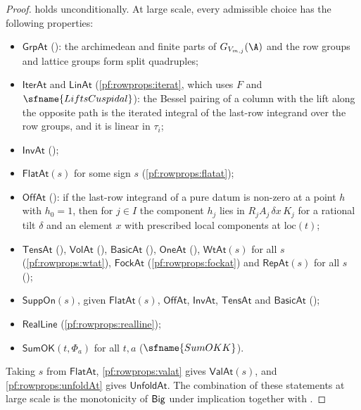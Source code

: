 \begin{proof}
 holds unconditionally. At large scale, every admissible choice has the following properties:
\begin{itemize}
\item $\mathsf{GrpAt}$ (): the archimedean and finite parts of $G_{V_{m,j}}(\A)$ and
the row groups and lattice groups form split quadruples;
\item $\mathsf{IterAt}$ and $\mathsf{LinAt}$ (\cref{pf:rowprops:iterat}, which uses $F$ and
$\sfname{LiftsCuspidal}$): the Bessel pairing of a column with the lift along the opposite path is the iterated integral of
the last-row integrand over the row groups, and it is linear in $\tau_i$;
\item $\mathsf{InvAt}$ ();
\item $\mathsf{FlatAt}(s)$ for some sign $s$ (\cref{pf:rowprops:flatat});
\item $\mathsf{OffAt}$ (): if the last-row integrand of a pure
datum is non-zero at a point $h$ with $h_0=1$, then for $j\in I$ the component $h_j$ lies in $R_jA_j\,\delta x\,K_j$ for a
rational tilt $\delta$ and an element $x$ with prescribed local components at $\mathrm{loc}(t)$;
\item $\mathsf{TensAt}$ (), $\mathsf{VolAt}$
(), $\mathsf{BasicAt}$
(), $\mathsf{OneAt}$ (),
$\mathsf{WtAt}(s)$ for all $s$ (\cref{pf:rowprops:wtat}), $\mathsf{FockAt}$ (\cref{pf:rowprops:fockat}) and $\mathsf{RepAt}(s)$ for all $s$
();
\item $\mathsf{SuppOn}(s)$, given $\mathsf{FlatAt}(s)$, $\mathsf{OffAt}$, $\mathsf{InvAt}$, $\mathsf{TensAt}$ and $\mathsf{BasicAt}$
();
\item $\mathsf{RealLine}$ (\cref{pf:rowprops:realline});
\item $\mathsf{SumOK}(t,\Phi_a)$ for all $t,a$ ($\sfname{SumOKK}$).
\end{itemize}
Taking $s$ from $\mathsf{FlatAt}$, \cref{pf:rowprops:valat} gives $\mathsf{ValAt}(s)$, and \cref{pf:rowprops:unfoldAt} gives
$\mathsf{UnfoldAt}$. The combination of these statements at large scale is the monotonicity of $\mathsf{Big}$ under
implication together with .
\end{proof}


